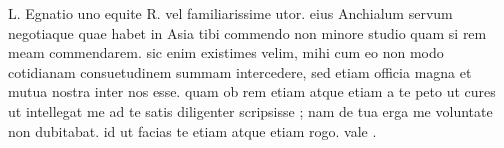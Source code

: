 


L. Egnatio uno equite R. vel familiarissime utor. eius Anchialum servum negotiaque quae habet in Asia tibi commendo non minore studio quam si rem meam commendarem. sic enim existimes velim, mihi cum eo non modo cotidianam consuetudinem summam intercedere, sed etiam officia magna et mutua nostra inter nos esse. quam ob rem etiam atque etiam a te peto ut cures ut intellegat me ad te satis diligenter scripsisse ; nam de tua erga me voluntate non dubitabat. id ut facias te etiam atque etiam rogo. vale .
